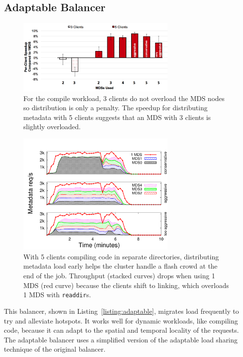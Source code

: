 \subsection{Adaptable Balancer}						%
\label{adaptable-balancer}								%
\begin{figure}[tbh]
	\centering	
	\includegraphics[width=0.7\textwidth]{./chapters/mantle/figures/eval_spill-evenly_compile_bar}\caption{For the compile workload, 3 clients do not overload the MDS nodes so distribution is only a penalty. The speedup for distributing metadata with 5 clients suggests that an MDS with 3 clients is slightly overloaded.  \label{figure:eval_spill-evenly_compile_bar}}
\end{figure}
\begin{figure}[tbh]
	\centering	
	\includegraphics[width=0.7\textwidth]{./chapters/mantle/figures/eval_spill-evenly_compile}\caption{With 5 clients compiling code in separate directories, distributing metadata load early helps the cluster handle a flash crowd at the end of the job. Throughput (stacked curves) drops when using 1 MDS (red curve) because the clients shift to linking, which overloads 1 MDS with \texttt{readdir}s.\label{figure:eval_spill-evenly_compile}}
\end{figure}

This balancer, shown in Listing~\ref{listing:adaptable}, migrates load frequently to try and alleviate hotspots. It works well for dynamic workloads, like compiling code, because it can adapt to the spatial and temporal locality of the requests. The adaptable balancer uses a simplified version of the adaptable load sharing technique of the original balancer.

